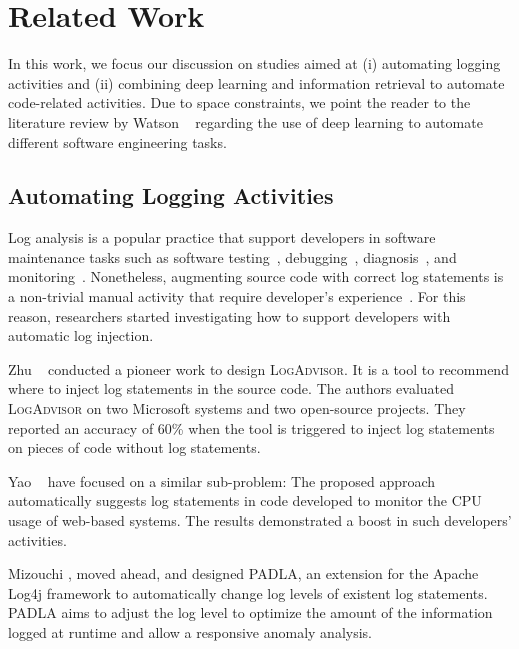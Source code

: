 \section{Related Work} \label{sec:related}

In this work, we focus our discussion on studies aimed at (i) automating logging activities and (ii) combining deep learning and information retrieval to automate code-related activities. Due to space constraints, we point the reader to the literature review by Watson \etal~\cite{watsonSytematicLiterature2020} regarding the use of deep learning to automate different software engineering tasks.

\subsection{Automating Logging Activities}

Log analysis is a popular practice that support developers in software maintenance tasks such as software testing~\cite{chen2018automated,chen2019experience}, debugging~\cite{satyanarayanan1992transparent}, diagnosis~\cite{zhou2019latent,yuan2012improving}, and monitoring~\cite{hasselbring2020kieker,harty2021logging}. Nonetheless, augmenting source code with correct log statements is a non-trivial manual activity that require developer's experience~\cite{li2020qualitative,yuan2012characterizing}. For this reason, researchers started investigating how to support developers with automatic log injection.

Zhu \etal~\cite{zhu2015learning} conducted a pioneer work to design \textsc{LogAdvisor}. It is a tool to recommend where to inject log statements in the source code. The authors evaluated \textsc{LogAdvisor} on two Microsoft systems and two open-source projects. They reported an accuracy of 60\% when the tool is triggered to inject log statements on pieces of code without log statements.

Yao \etal~\cite{yao2018log4perf} have focused on a similar sub-problem: The proposed approach automatically suggests log statements in code developed to monitor the CPU usage of web-based systems. The results demonstrated a boost in such developers' activities.

Mizouchi \etal \cite{mizouchi2019padla}, moved ahead, and designed \textsc{PADLA}, an extension for the Apache Log4j framework to automatically change log levels of existent log statements. \textsc{PADLA} aims to adjust the log level to optimize the amount of the information logged at runtime and allow a responsive anomaly analysis.

